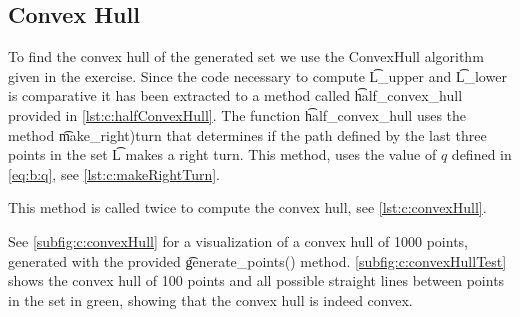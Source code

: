 \subsection*{Convex Hull}
	To find the convex hull of the generated set we use the ConvexHull algorithm given in the exercise. Since the code necessary to compute \t{L\_upper} and \t{L\_lower} is comparative it has been extracted to a method called \t{half\_convex\_hull} provided in \autoref{lst:c:halfConvexHull}. The function \t{half\_convex\_hull} uses the method \t{make_right)turn} that determines if the path defined by the last three points in the set \t{L} makes a right turn. This method, uses the value of $q$ defined in \eqref{eq:b:q}, see \autoref{lst:c:makeRightTurn}. 

	This method is called twice to compute the convex hull, see \autoref{lst:c:convexHull}.

	

	

	

	See \autoref{subfig:c:convexHull} for a visualization of a convex hull of 1000 points, generated with the provided \t{generate\_points()} method. \autoref{subfig:c:convexHullTest} shows the convex hull of 100 points and all possible straight lines between points in the set in green, showing that the convex hull is indeed convex.


